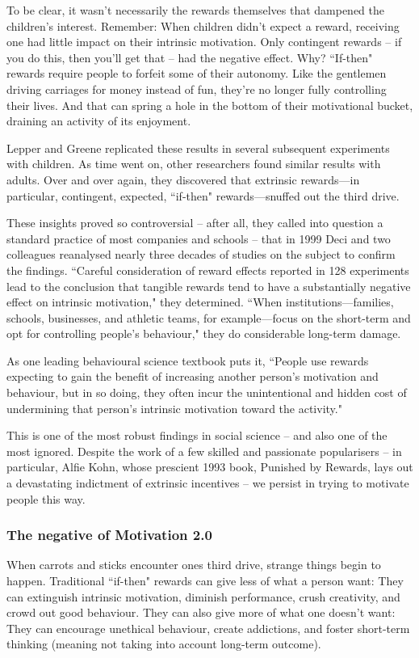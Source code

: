 To be clear, it wasn’t necessarily the rewards themselves that dampened the children’s interest. Remember: When children didn’t expect a reward, receiving one had little impact on their intrinsic motivation. Only contingent rewards -- if you do this, then you’ll get that -- had the negative effect. Why? ``If-then" rewards require people to forfeit some of their autonomy. Like the gentlemen driving carriages for money instead of fun, they’re no longer fully controlling their lives. And that can spring a hole in the bottom of their motivational bucket, draining an activity of its enjoyment.

Lepper and Greene replicated these results in several subsequent experiments with children. As time went on, other researchers found similar results with adults. Over and over again, they discovered that extrinsic rewards—in particular, contingent, expected, ``if-then" rewards—snuffed out the third drive.

These insights proved so controversial -- after all, they called into question a standard practice of most companies and schools -- that in 1999 Deci and two colleagues reanalysed nearly three decades of studies on the subject to confirm the findings. ``Careful consideration of reward effects reported in 128 experiments lead to the conclusion that tangible rewards tend to have a substantially negative effect on intrinsic motivation," they determined. ``When institutions—families, schools, businesses, and athletic teams, for example—focus on the short-term and opt for controlling people’s behaviour," they do considerable long-term damage.

As one leading behavioural science textbook puts it, ``People use rewards expecting to gain the benefit of increasing another person’s motivation and behaviour, but in so doing, they often incur the unintentional and hidden cost of undermining that person’s intrinsic motivation toward the activity."

This is one of the most robust findings in social science -- and also one of the most ignored. Despite the work of a few skilled and passionate popularisers -- in particular, Alfie Kohn, whose prescient 1993 book, Punished by Rewards, lays out a devastating indictment of extrinsic incentives -- we persist in trying to motivate people this way.

\subsubsection{The negative of Motivation 2.0}
When carrots and sticks encounter ones third drive, strange things begin to happen. Traditional ``if-then" rewards can give  less of what a person want: They can extinguish intrinsic motivation, diminish performance, crush creativity, and crowd out good behaviour. They can also give more of what one doesn’t want: They can encourage unethical behaviour, create addictions, and foster short-term thinking (meaning not taking into account long-term outcome).

